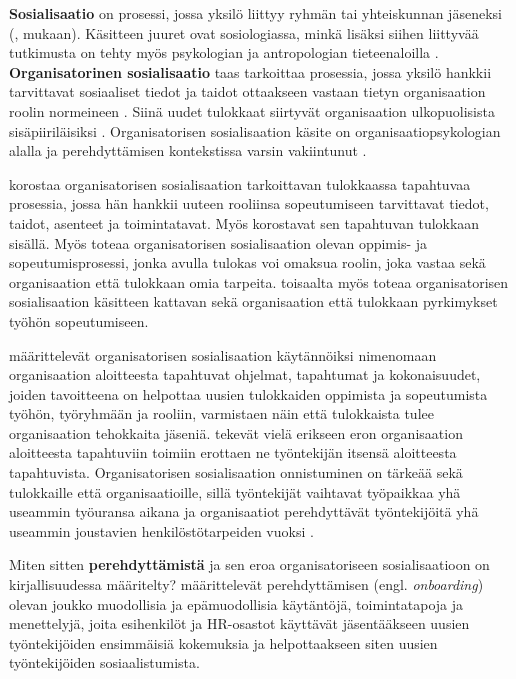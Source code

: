 \documentclass[utf8]{gradu3}
\begin{document}
\textbf{Sosialisaatio} on prosessi, jossa yksilö liittyy ryhmän tai yhteiskunnan jäseneksi (\textcite{brim-1966}, \textcite{chao-2012} mukaan). Käsitteen juuret ovat sosiologiassa, minkä lisäksi siihen liittyvää tutkimusta on tehty myös psykologian ja antropologian tieteenaloilla \parencite{chao-2012}. \textbf{Organisatorinen sosialisaatio} taas tarkoittaa prosessia, jossa yksilö hankkii tarvittavat sosiaaliset tiedot ja taidot ottaakseen vastaan tietyn organisaation roolin normeineen \parencite{van-maanen-schein-1979}. Siinä uudet tulokkaat siirtyvät organisaation ulkopuolisista sisäpiiriläisiksi \parencite{bauer-ym-2007}. Organisatorisen sosialisaation käsite on organisaatiopsykologian alalla ja perehdyttämisen kontekstissa varsin vakiintunut %
\parencites%
    [ks. esim.][]{van-maanen-schein-1979}%
    {bauer-2010}%
    {bauer-erdogan-2012}%
    {saks-gruman-2012}%
    [myös ohjelmistokehityksen alalla esim.][]{sharma-stol-2019}%
    [tai][]{britto-ym-2017}%
\relax.
%

\textcite{wanberg-2012} korostaa organisatorisen sosialisaation tarkoittavan tulokkaassa tapahtuvaa prosessia, jossa hän hankkii uuteen rooliinsa sopeutumiseen tarvittavat tiedot, taidot, asenteet ja toimintatavat. Myös \textcite{klein-polin-2012} korostavat sen tapahtuvan tulokkaan sisällä. Myös \textcite{chao-2012} toteaa organisatorisen sosialisaation olevan oppimis- ja sopeutumisprosessi, jonka avulla tulokas voi omaksua roolin, joka vastaa sekä organisaation että tulokkaan omia tarpeita. \textcite{chao-2012} toisaalta myös toteaa organisatorisen sosialisaation käsitteen kattavan sekä organisaation että tulokkaan pyrkimykset työhön sopeutumiseen.

\textcite{saks-gruman-2012} määrittelevät organisatorisen sosialisaation käytännöiksi nimenomaan organisaation aloitteesta tapahtuvat ohjelmat, tapahtumat ja kokonaisuudet, joiden tavoitteena on helpottaa uusien tulokkaiden oppimista ja sopeutumista työhön, työryhmään ja rooliin, varmistaen näin että tulokkaista tulee organisaation tehokkaita jäseniä. \textcite{saks-gruman-2012} tekevät vielä erikseen eron organisaation aloitteesta tapahtuviin toimiin erottaen ne työntekijän itsensä aloitteesta tapahtuvista. Organisatorisen sosialisaation onnistuminen on tärkeää sekä tulokkaille että organisaatioille, sillä työntekijät vaihtavat työpaikkaa yhä useammin työuransa aikana ja organisaatiot perehdyttävät työntekijöitä yhä useammin joustavien henkilöstötarpeiden vuoksi \parencite{bauer-ym-2007}.

Miten sitten \textbf{perehdyttämistä} ja sen eroa organisatoriseen sosialisaatioon on kirjallisuudessa määritelty? \textcite{klein-polin-2012} määrittelevät perehdyttämisen (engl. \textit{onboarding}) olevan joukko muodollisia ja epämuodollisia käytäntöjä, toimintatapoja ja menettelyjä, joita esihenkilöt ja HR-osastot käyttävät jäsentääkseen uusien työntekijöiden ensimmäisiä kokemuksia ja helpottaakseen siten uusien työntekijöiden sosiaalistumista.
\end{document}
